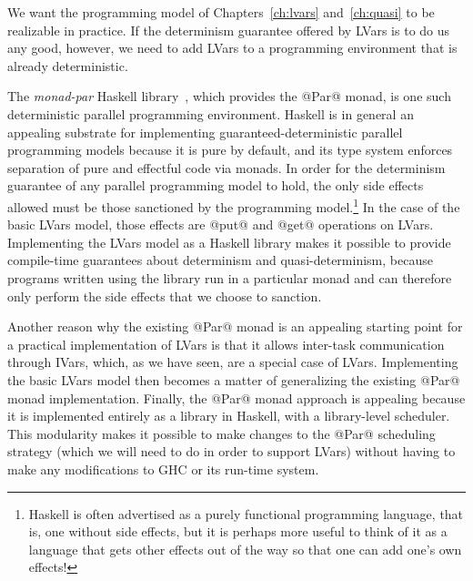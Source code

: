 We want the programming model of Chapters~\ref{ch:lvars}
and~\ref{ch:quasi} to be realizable in practice.  If the determinism
guarantee offered by LVars is to do us any good, however, we need to
add LVars to a programming environment that is already deterministic.

The \emph{monad-par} Haskell library~\cite{monad-par}, which provides
the @Par@ monad, is one such deterministic parallel programming
environment.  Haskell is in general an appealing substrate for
implementing guaranteed-deterministic parallel programming models
because it is pure by default, and its type system enforces separation
of pure and effectful code via monads.  In order for the determinism
guarantee of any parallel programming model to hold, the only side
effects allowed must be those sanctioned by the programming
model.\footnote{Haskell is often advertised as a purely functional
programming language, that is, one without side effects, but it is
perhaps more useful to think of it as a language that gets other
effects out of the way so that one can add one's own effects!}  In the
case of the basic LVars model, those effects are @put@ and @get@
operations on LVars. 
Implementing the LVars model as a Haskell library makes it possible to
provide compile-time guarantees about determinism and
quasi-determinism, because programs written using the library run in a
particular monad and can therefore only perform the side effects that
we choose to sanction.

Another reason why the existing @Par@ monad is an appealing starting
point for a practical implementation of LVars is that it allows
inter-task communication through IVars, which, as we have seen, are a
special case of LVars.  Implementing the basic LVars model then
becomes a matter of generalizing the existing @Par@ monad
implementation.  Finally, the @Par@ monad approach is appealing
because it is implemented entirely as a library in Haskell, with a
library-level scheduler.  This modularity makes it possible to make
changes to the @Par@ scheduling strategy (which we will need to do in
order to support LVars) without having to make any modifications to
GHC or its run-time system.


